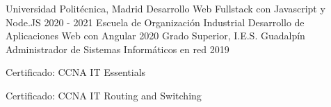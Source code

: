 
\begin{cventries}
    \cventry
    {Universidad Politécnica, Madrid}
    {Desarrollo Web Fullstack con Javascript y Node.JS}
    {}
    {2020 - 2021}
    {}
    \vspace{-0.5em}
    \cventry
    {Escuela de Organización Industrial}
    {Desarrollo de Aplicaciones Web con Angular}
    {}
    {2020}
    {}
    \vspace{-0.5em}
    \cventry
    {Grado Superior, I.E.S. Guadalpín}
    {Administrador de Sistemas Informáticos en red}
    {}
    {2019}
    {
        \begin{cvitems}
            \item{Certificado: CCNA IT Essentials}
            \item{Certificado: CCNA IT Routing and Switching}            
        \end{cvitems}
    }
\end{cventries}